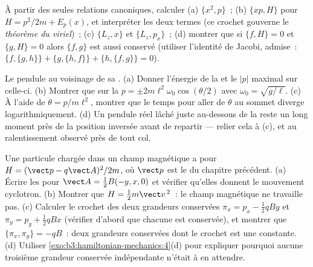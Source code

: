 \begin{exercise}[$\star$]\label{exo:b3:hamiltonian-mechanics:4}
À partir des seules relations canoniques, calculer (a) $\{x^2, p\}$~;
(b) $\{xp, H\}$ pour $H = p^2/2m + E_p(x)$, et interpréter les deux
termes (ce crochet gouverne le \emph{théorème du viriel})~; (c)
$\{L_z, x\}$ et $\{L_z, p_x\}$~; (d) montrer que si $\{f, H\} = 0$ et
$\{g, H\} = 0$ alors $\{f, g\}$ est aussi conservé (utiliser
l'identité de Jacobi, admise~:
$\{f,\{g,h\}\} + \{g,\{h,f\}\} + \{h,\{f,g\}\} = 0$).
\end{exercise}

\begin{exercise}[$\star\star$]\label{exo:b3:hamiltonian-mechanics:5}
Le pendule au voisinage de sa . (a) Donner l'énergie de la
 et le $|p|$ maximal sur celle-ci. (b) Montrer que sur la  $p =
\pm 2m\ell^2\omega_0\cos(\theta/2)$ avec $\omega_0 = \sqrt{g/\ell}$.
(c) À l'aide de $\dot\theta = p/m\ell^2$, montrer que le temps pour
aller de $\theta$ au sommet diverge logarithmiquement. (d) Un pendule
réel lâché juste au-dessous de la  reste un long moment près
de la position inversée avant de repartir --- relier cela à (c), et au
ralentissement observé près de tout col.
\end{exercise}

\begin{exercise}[$\star\star$]\label{exo:b3:hamiltonian-mechanics:6}
Une particule chargée dans un champ magnétique a pour $H = (\vect p -
q\vect A)^2/2m$, où $\vect p$ est le  du chapitre
précédent. (a) Écrire les  pour $\vect A = \tfrac12
B(-y, x, 0)$ et vérifier qu'elles donnent le mouvement cyclotron. (b) Montrer que $H =
\tfrac12 m\vect v^{\,2}$~: le champ magnétique ne travaille pas. (c)
Calculer le crochet des deux grandeurs conservées $\pi_x = p_x - \tfrac12
qBy$ et $\pi_y = p_y + \tfrac12 qBx$ (vérifier d'abord que chacune est
conservée), et montrer que $\{\pi_x, \pi_y\} = -qB$~: deux grandeurs
conservées dont le crochet est une constante. (d) Utiliser
\cref{exo:b3:hamiltonian-mechanics:4}(d) pour expliquer pourquoi
aucune troisième grandeur conservée indépendante n'était à en attendre.
\end{exercise}

